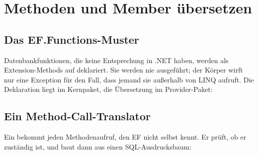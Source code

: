 \chapter{Methoden und Member übersetzen}\label{ch:translating-methods-and-members}

\section{Das EF.Functions-Muster}

Datenbankfunktionen, die keine Entsprechung in .NET haben, werden als Extension-Methods auf
 deklariert. Sie werden nie ausgeführt; der Körper wirft nur
eine Exception für den Fall, dass jemand sie außerhalb von LINQ aufruft. Die Deklaration
liegt im Kernpaket, die Übersetzung im Provider-Paket:


\section{Ein Method-Call-Translator}

Ein  bekommt jeden Methodenaufruf, den
EF nicht selbst kennt. Er prüft, ob er zuständig ist, und baut dann aus
 einen SQL-Ausdrucksbaum:

